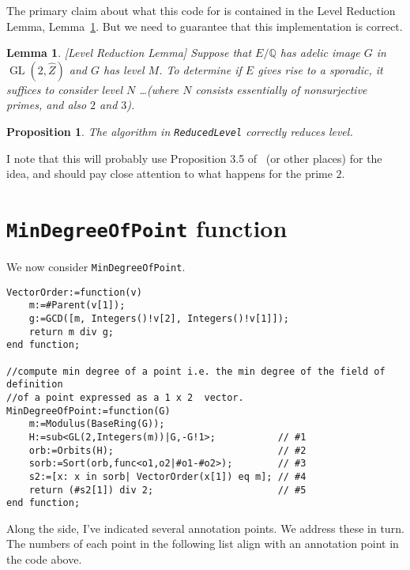\documentclass[11pt,reqno]{amsart}
\theoremstyle{plain}
\newtheorem{lemma}[theorem]{Lemma}
\newtheorem{proposition}[theorem]{Proposition}
\theoremstyle{definition}
\DeclareMathOperator{\GL}{GL}
\begin{document}
The primary claim about what this code for is contained in the Level Reduction
Lemma, Lemma~\ref{lemma:reduced_level}. But we need to guarantee that this
implementation is correct.

\begin{lemma}\label{lemma:reduced_level}[Level Reduction Lemma]
  Suppose that $E/\mathbb{Q}$ has adelic image $G$ in $\GL(2, \widehat{Z})$ and
  $G$ has level $M$. To determine if $E$ gives rise to a sporadic, it suffices
  to consider level $N$ \ldots (where $N$ consists essentially of nonsurjective
  primes, and also $2$ and $3$).
\end{lemma}


\begin{proposition}
  The algorithm in \texttt{ReducedLevel} correctly reduces level.
\end{proposition}

I note that this will probably use Proposition 3.5 of~\cite{Bourdon2019} (or
other places) for the idea, and should pay close attention to what happens for
the prime $2$.



\section{\texttt{MinDegreeOfPoint} function}\label{sec:mindegreeofpoint}

We now consider \texttt{MinDegreeOfPoint}.

\begin{verbatim}
VectorOrder:=function(v)
    m:=#Parent(v[1]);
    g:=GCD([m, Integers()!v[2], Integers()!v[1]]);
    return m div g;
end function;

//compute min degree of a point i.e. the min degree of the field of definition
//of a point expressed as a 1 x 2  vector.
MinDegreeOfPoint:=function(G)
    m:=Modulus(BaseRing(G));
    H:=sub<GL(2,Integers(m))|G,-G!1>;           // #1
    orb:=Orbits(H);                             // #2
    sorb:=Sort(orb,func<o1,o2|#o1-#o2>);        // #3
    s2:=[x: x in sorb| VectorOrder(x[1]) eq m]; // #4
    return (#s2[1]) div 2;                      // #5
end function;
\end{verbatim}

Along the side, I've indicated several annotation points. We address these in
turn. The numbers of each point in the following list align with an annotation
point in the code above.
\end{document}
